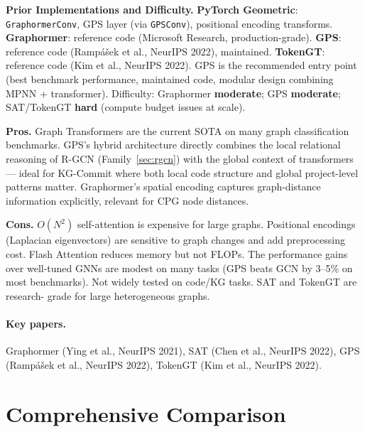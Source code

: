 \documentclass[12pt,a4paper]{article}
\begin{document}
\begin{implbox}
\textbf{Prior Implementations and Difficulty.}
\textbf{PyTorch Geometric}: \texttt{GraphormerConv}, GPS layer (via
\texttt{GPSConv}), positional encoding transforms.
\textbf{Graphormer}: reference code (Microsoft Research, production-grade).
\textbf{GPS}: reference code (Ramp\'{a}\v{s}ek et al., NeurIPS 2022), maintained.
\textbf{TokenGT}: reference code (Kim et al., NeurIPS 2022). GPS is the
recommended entry point (best benchmark performance, maintained code, modular
design combining MPNN + transformer). Difficulty: Graphormer \textbf{moderate};
GPS \textbf{moderate}; SAT/TokenGT \textbf{hard} (compute budget issues at scale).
\end{implbox}

\begin{prosbox}
\textbf{Pros.}
Graph Transformers are the current SOTA on many graph classification
benchmarks. GPS's hybrid architecture directly combines the local relational
reasoning of R-GCN (Family~\ref{sec:rgcn}) with the global context of
transformers --- ideal for KG-Commit where both local code structure and
global project-level patterns matter. Graphormer's spatial encoding captures
graph-distance information explicitly, relevant for CPG node distances.
\end{prosbox}

\begin{consbox}
\textbf{Cons.}
$O(N^2)$ self-attention is expensive for large graphs. Positional encodings
(Laplacian eigenvectors) are sensitive to graph changes and add preprocessing
cost. Flash Attention reduces memory but not FLOPs. The performance gains over
well-tuned GNNs are modest on many tasks (GPS beats GCN by 3--5\% on most
benchmarks). Not widely tested on code/KG tasks. SAT and TokenGT are research-
grade for large heterogeneous graphs.
\end{consbox}

\paragraph{Key papers.} Graphormer (Ying et al., NeurIPS 2021), SAT (Chen et al.,
NeurIPS 2022), GPS (Ramp\'{a}\v{s}ek et al., NeurIPS 2022), TokenGT (Kim et al.,
NeurIPS 2022).

\section{Comprehensive Comparison}
\end{document}
